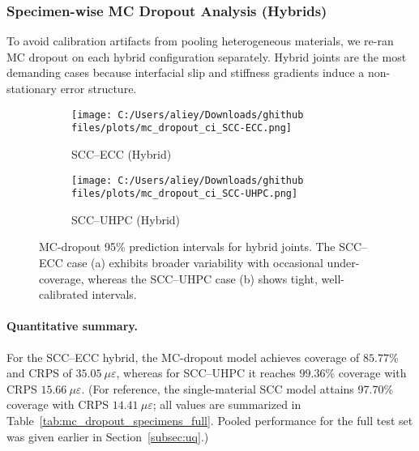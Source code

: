\documentclass{article}
\begin{document}
\subsubsection{Specimen-wise MC Dropout Analysis (Hybrids)}
\label{subsec:mc_dropout_specimens_hybrids}

To avoid calibration artifacts from pooling heterogeneous materials, we re-ran MC dropout on each hybrid configuration separately. Hybrid joints are the most demanding cases because interfacial slip and stiffness gradients induce a non-stationary error structure.

\begin{figure}[h]
\centering
\begin{subfigure}[t]{0.48\linewidth}
    \centering
    \texttt{[image: C:/Users/aliey/Downloads/ghithub files/plots/mc\_dropout\_ci\_SCC-ECC.png]}
    \caption{SCC–ECC (Hybrid)}
    \label{fig:mcdo_scc_ecc}
\end{subfigure}\hfill
\begin{subfigure}[t]{0.48\linewidth}
    \centering
    \texttt{[image: C:/Users/aliey/Downloads/ghithub files/plots/mc\_dropout\_ci\_SCC-UHPC.png]}
    \caption{SCC–UHPC (Hybrid)}
    \label{fig:mcdo_scc_uhpc}
\end{subfigure}
\caption{MC-dropout 95\% prediction intervals for hybrid joints. The SCC–ECC case (a) exhibits broader variability with occasional under-coverage, whereas the SCC–UHPC case (b) shows tight, well-calibrated intervals.}
\label{fig:mcdo_hybrids_sidebyside}
\end{figure}

\paragraph{Quantitative summary.} For the SCC–ECC hybrid, the MC-dropout model achieves coverage of $85.77\%$ and CRPS of $35.05~\mu\varepsilon$, whereas for SCC–UHPC it reaches $99.36\%$ coverage with CRPS $15.66~\mu\varepsilon$. (For reference, the single-material SCC model attains 97.70\% coverage with CRPS $14.41~\mu\varepsilon$; all values are summarized in Table~\ref{tab:mc_dropout_specimens_full}. Pooled performance for the full test set was given earlier in Section~\ref{subsec:uq}.)
\end{document}

